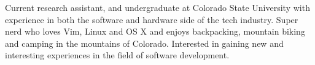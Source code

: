 

\begin{cvparagraph}

Current research assistant, and undergraduate at Colorado State University with experience
in both the software and hardware side of the tech industry.
Super nerd who loves Vim, Linux and OS X and enjoys backpacking, mountain biking and
camping in the mountains of Colorado. Interested in gaining new and interesting experiences
in the field of software development.
\end{cvparagraph}
